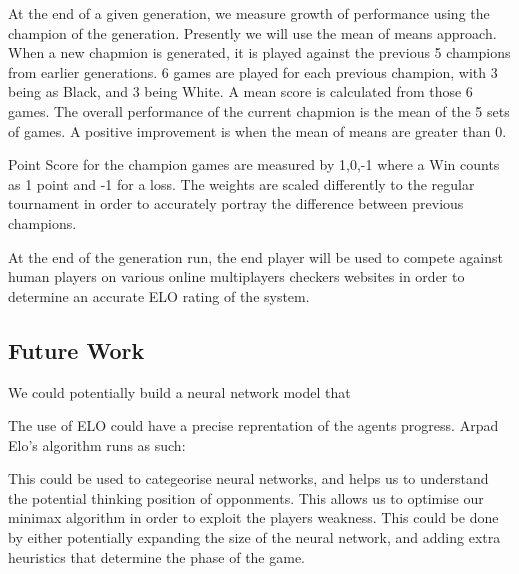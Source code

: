 \documentclass[12pt,a4paper]{article}
\begin{document}
At the end of a given generation, we measure growth of performance using the champion of the generation. Presently we will use the mean of means approach. When a new chapmion is generated, it is played against the previous 5 champions from earlier generations. 6 games are played for each previous champion, with 3 being as Black, and 3 being White. A mean score is calculated from those 6 games. The overall performance of the current chapmion is the mean of the 5 sets of games. A positive improvement is when the mean of means are greater than 0. 

Point Score for the champion games are measured by {1,0,-1} where a Win counts as 1 point and -1 for a loss. The weights are scaled differently to the regular tournament in order to accurately portray the difference between previous champions.

At the end of the generation run, the end player will be used to compete against human players on various online multiplayers checkers websites in order to determine an accurate ELO rating of the system.

\subsection{Future Work}
We could potentially build a neural network model that 

The use of ELO could have a precise reprentation of the agents progress. Arpad Elo's algorithm runs as such:

This could be used to categeorise neural networks, and helps us to understand the potential thinking position of opponments. This allows us to optimise our minimax algorithm in order to exploit the players weakness. This could be done by either potentially expanding the size of the neural network, and adding extra heuristics that determine the phase of the game.

\end{document}

